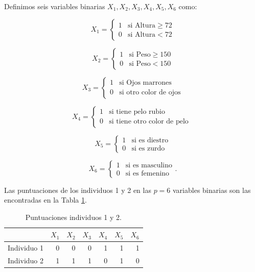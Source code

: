 \documentclass[a4paper, 20pt]{article}
\begin{document}
Definimos seis variables binarias $X_1,X_2,X_3,X_4,X_5,X_6$ como:

$$X_1 = \left \{ \begin{matrix} 1 & \mbox{si Altura}  \geq 72 
\\ 0 & \mbox{si Altura}  < 72 \end{matrix}\right.$$

$$X_2 = \left \{ \begin{matrix} 1 & \mbox{si Peso}  \geq 150 
\\ 0 & \mbox{si Peso}  < 150 \end{matrix}\right.   $$

$$X_3 = \left \{ \begin{matrix} 1 & \mbox{si Ojos marrones} 
\\ 0 & \mbox{si otro color de ojos}\end{matrix}\right.   $$

$$X_4 = \left \{ \begin{matrix} 1 & \mbox{si tiene pelo rubio} 
\\ 0 & \mbox{si tiene otro color de pelo } \end{matrix}\right.   $$

$$X_5 = \left \{ \begin{matrix} 1 & \mbox{si es diestro} 
\\ 0 & \mbox{si es zurdo } \end{matrix}\right.   $$

$$X_6 = \left \{ \begin{matrix} 1 & \mbox{si es masculino} 
\\ 0 & \mbox{si es femenino}  \end{matrix}\right.   .$$

Las puntuaciones de los individuos 1 y 2 en las $p=6$ variables binarias son las encontradas en la Tabla \ref{tab:puntuaciones}.

\begin{table}[h]
  \centering
  \caption{Puntuaciones individuos 1 y 2.}
  \label{tab:puntuaciones}
\resizebox{8cm}{!} {
  \begin{tabular}{lrrrrrr}
    \toprule
            & \multicolumn{1}{l}{$X_1$} & \multicolumn{1}{l}{$X_2$} & \multicolumn{1}{l}{$X_3$} & \multicolumn{1}{l}{$X_4$} & \multicolumn{1}{l}{$X_5$} & \multicolumn{1}{l}{$X_6$} \\ \midrule
Individuo 1 & 0                        & 0                        & 0                        & 1                        & 1                        & 1                        \\
Individuo 2 & 1                        & 1                        & 1                        & 0                        & 1                        & 0\\
\bottomrule
\end{tabular}
}
\end{table}
\end{document}
